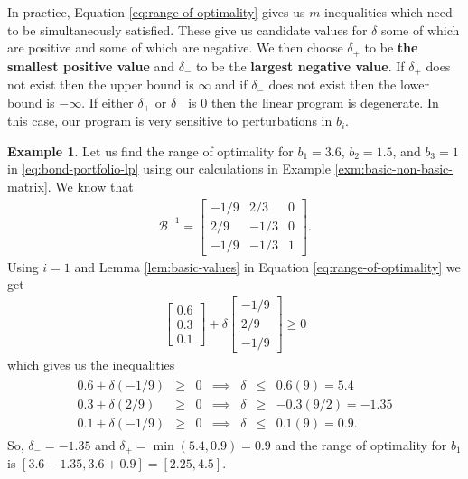\documentclass[
]{book}
\theoremstyle{definition}
\theoremstyle{definition}
\newtheorem{example}{Example}[chapter]
\theoremstyle{definition}
\theoremstyle{definition}
\theoremstyle{remark}
\begin{document}
In practice, Equation \eqref{eq:range-of-optimality} gives us \(m\) inequalities which need to be
simultaneously satisfied. These give us candidate values for \(\delta\) some of which are positive and
some of which are negative. We then choose \(\delta_+\) to be \textbf{the smallest positive value} and
\(\delta_-\) to be the \textbf{largest negative value}. If \(\delta_+\) does not exist then the upper bound
is \(\infty\) and if \(\delta_-\) does not exist then the lower bound is \(-\infty\). If either \(\delta_+\)
or \(\delta_-\) is 0 then the linear program is degenerate. In this case, our program is very
sensitive to perturbations in \(b_i\).

\begin{example}
Let us find the range of optimality for \(b_1 = 3.6\), \(b_2=1.5\), and \(b_3 = 1\) in
\eqref{eq:bond-portfolio-lp} using our calculations in Example \ref{exm:basic-non-basic-matrix}. We
know that
\begin{align*}
  \mathcal{B}^{-1} = 
    \begin{bmatrix}
    -1/9 & 2/3 & 0 \\
    2/9 & -1/3 & 0 \\
    -1/9 & -1/3 & 1
    \end{bmatrix}.
\end{align*}
Using \(i = 1\) and Lemma \ref{lem:basic-values} in Equation \eqref{eq:range-of-optimality} we get
\begin{align*}
  \begin{bmatrix} 0.6 \\ 0.3 \\ 0.1 \end{bmatrix} 
  + \delta
  \begin{bmatrix}
    -1/9 \\ 
    2/9 \\
    -1/9
  \end{bmatrix} \ge 0
\end{align*}
which gives us the inequalities
\begin{align*}
  \begin{array}{lrlrrll}
    0.6 + \delta (-1/9) &\ge & 0 & \implies & \delta &\le & 0.6 (9) = 5.4 \\
    0.3 + \delta (2/9) &\ge & 0 & \implies & \delta &\ge & -0.3 (9/2) = -1.35  \\
    0.1 + \delta (-1/9) &\ge & 0 & \implies & \delta & \le & 0.1 (9) = 0.9.  
  \end{array}
\end{align*}
So, \(\delta_- = -1.35\) and \(\delta_+ = \min(5.4, 0.9) = 0.9\) and the range of optimality for \(b_1\) is \([3.6 - 1.35, 3.6 + 0.9] = [2.25, 4.5]\).


\end{example}
\end{document}
